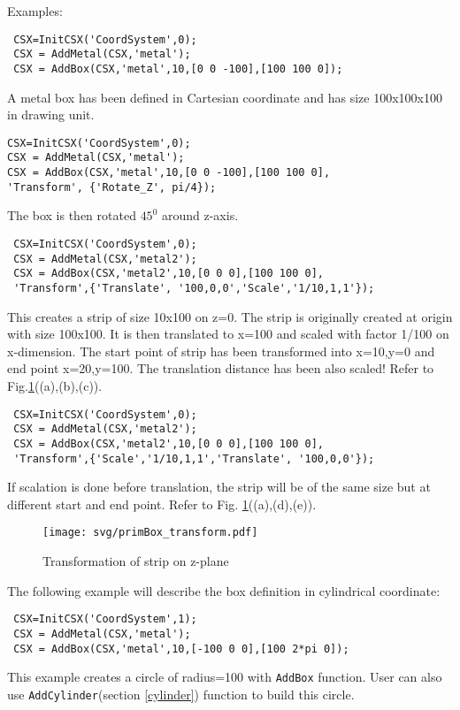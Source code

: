 \begin{FontDescr}{Examples:}

\begin{lstlisting}
 CSX=InitCSX('CoordSystem',0);
 CSX = AddMetal(CSX,'metal'); 
 CSX = AddBox(CSX,'metal',10,[0 0 -100],[100 100 0]);
\end{lstlisting} 
A metal box has been defined in Cartesian coordinate and has size 100x100x100 in drawing unit.

\begin{lstlisting}
CSX=InitCSX('CoordSystem',0);
CSX = AddMetal(CSX,'metal'); 
CSX = AddBox(CSX,'metal',10,[0 0 -100],[100 100 0],
'Transform', {'Rotate_Z', pi/4});  
\end{lstlisting}  
The box is then rotated $45^{0}$ around z-axis.   

\begin{lstlisting}
 CSX=InitCSX('CoordSystem',0);
 CSX = AddMetal(CSX,'metal2'); 
 CSX = AddBox(CSX,'metal2',10,[0 0 0],[100 100 0],
 'Transform',{'Translate', '100,0,0','Scale','1/10,1,1'});
\end{lstlisting} 
This creates a strip of size 10x100 on z=0. The strip is originally created at origin with size 100x100. It is then translated to x=100 and scaled with factor 1/100 on x-dimension. The start point of strip has been transformed into x=10,y=0 and end point x=20,y=100. The translation distance has been also scaled! Refer to Fig.\ref{fig:primBoxtransform}((a),(b),(c)).

\begin{lstlisting}
 CSX=InitCSX('CoordSystem',0);
 CSX = AddMetal(CSX,'metal2'); 
 CSX = AddBox(CSX,'metal2',10,[0 0 0],[100 100 0],
 'Transform',{'Scale','1/10,1,1','Translate', '100,0,0'});
\end{lstlisting}

If scalation is done before translation, the strip will be of the same size but at different start and end point. Refer to Fig. \ref{fig:primBoxtransform}((a),(d),(e)).     

\begin{figure}[h!]
\centering
\texttt{[image: svg/primBox\_transform.pdf]}
\caption{Transformation of strip on z-plane}
\label{fig:primBoxtransform}
\end{figure}

    
The following example will describe the box definition in cylindrical coordinate: 

\begin{lstlisting} 
 CSX=InitCSX('CoordSystem',1);
 CSX = AddMetal(CSX,'metal'); 
 CSX = AddBox(CSX,'metal',10,[-100 0 0],[100 2*pi 0]);
\end{lstlisting}
This example creates a circle of radius=100 with \texttt{AddBox} function. User can also use \texttt{AddCylinder}(section \ref{cylinder}) function to build this circle. 


\end{FontDescr}
